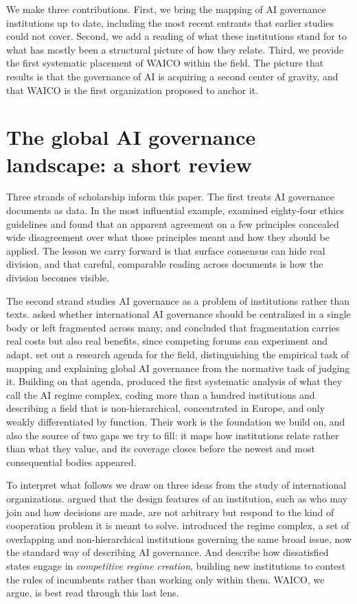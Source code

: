 \documentclass[11pt]{article}
\begin{document}
We make three contributions. First, we bring the mapping of AI governance institutions up to date, including the most recent entrants that earlier studies could not cover. Second, we add a reading of what these institutions stand for to what has mostly been a structural picture of how they relate. Third, we provide the first systematic placement of WAICO within the field. The picture that results is that the governance of AI is acquiring a second center of gravity, and that WAICO is the first organization proposed to anchor it.

\section{The global AI governance landscape: a short review}
Three strands of scholarship inform this paper. The first treats AI governance documents as data. In the most influential example, \citet{jobin2019global} examined eighty-four ethics guidelines and found that an apparent agreement on a few principles concealed wide disagreement over what those principles meant and how they should be applied. The lesson we carry forward is that surface consensus can hide real division, and that careful, comparable reading across documents is how the division becomes visible.

The second strand studies AI governance as a problem of institutions rather than texts. \citet{cihon2020fragmentation} asked whether international AI governance should be centralized in a single body or left fragmented across many, and concluded that fragmentation carries real costs but also real benefits, since competing forums can experiment and adapt. \citet{tallberg2023global} set out a research agenda for the field, distinguishing the empirical task of mapping and explaining global AI governance from the normative task of judging it. Building on that agenda, \citet{geith2025emerging} produced the first systematic analysis of what they call the AI regime complex, coding more than a hundred institutions and describing a field that is non-hierarchical, concentrated in Europe, and only weakly differentiated by function. Their work is the foundation we build on, and also the source of two gaps we try to fill: it maps how institutions relate rather than what they value, and its coverage closes before the newest and most consequential bodies appeared.

To interpret what follows we draw on three ideas from the study of international organizations. \citet{koremenos2001rational} argued that the design features of an institution, such as who may join and how decisions are made, are not arbitrary but respond to the kind of cooperation problem it is meant to solve. \citet{raustiala2004regime} introduced the regime complex, a set of overlapping and non-hierarchical institutions governing the same broad issue, now the standard way of describing AI governance. And \citet{morse2014contested} describe how dissatisfied states engage in \emph{competitive regime creation}, building new institutions to contest the rules of incumbents rather than working only within them. WAICO, we argue, is best read through this last lens.
\end{document}
